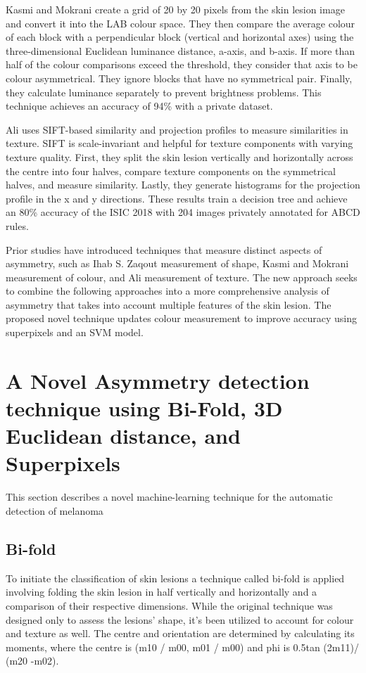 Kasmi and Mokrani\cite{Kasmi2016} create a grid of 20 by 20 pixels from the skin lesion image and convert it into the LAB colour space. They then compare the average colour of each block with a perpendicular block (vertical and horizontal axes) using the three-dimensional Euclidean luminance distance, a-axis, and b-axis. If more than half of the colour comparisons exceed the threshold, they consider that axis to be colour asymmetrical. They ignore blocks that have no symmetrical pair. Finally, they calculate luminance separately to prevent brightness problems. This technique achieves an accuracy of 94\% with a private dataset.

Ali\cite{Ali2020a} uses SIFT-based similarity and projection profiles to measure similarities in texture. SIFT is scale-invariant and helpful for texture components with varying texture quality. First, they split the skin lesion vertically and horizontally across the centre into four halves, compare texture components on the symmetrical halves, and measure similarity. Lastly, they generate histograms for the projection profile in the x and y directions. These results train a decision tree and achieve an 80\% accuracy of the ISIC 2018 with 204 images privately annotated for ABCD rules.

Prior studies have introduced techniques that measure distinct aspects of asymmetry, such as Ihab S. Zaqout\cite{Zaqout2016} measurement of shape, Kasmi and Mokrani\cite{Kasmi2016} measurement of colour, and  Ali\cite{Ali2020a} measurement of texture. The new approach seeks to combine the following approaches into a more comprehensive analysis of asymmetry that takes into account multiple features of the skin lesion. The proposed novel technique updates colour measurement to improve accuracy using superpixels and an SVM model.

\section{A Novel Asymmetry detection technique using Bi-Fold, 3D Euclidean distance, and Superpixels}
This section describes a novel machine-learning technique for the automatic detection of melanoma

\subsection{Bi-fold}
To initiate the classification of skin lesions a technique called bi-fold is applied involving folding the skin lesion in half vertically and horizontally and a comparison of their respective dimensions. While the original technique was designed only to assess the lesions' shape, it's been utilized to account for colour and texture as well. The centre and orientation are determined by calculating its moments, where the centre is (m10 / m00, m01 / m00) and phi is 0.5tan (2m11)/ (m20 -m02).

